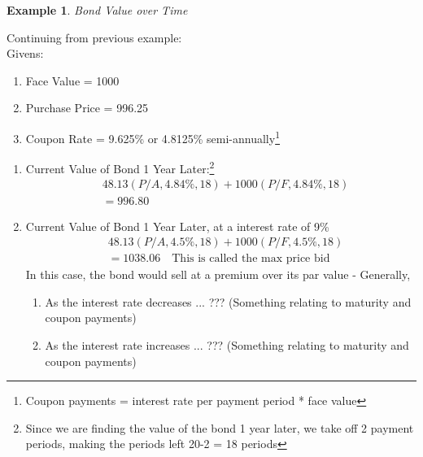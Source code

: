 \documentclass{report} %
\newtheorem{exmp}{Example}
\begin{document}
\begin{exmp}
    Bond Value over Time
\end{exmp}
Continuing from previous example: \\
Givens:
\begin{enumerate}
    \item Face Value = 1000
    \item Purchase Price = 996.25
    \item Coupon Rate = 9.625\% or 4.8125\% semi-annually\footnote{Coupon payments  = interest rate per payment period * face value}
\end{enumerate}
\begin{enumerate}
    \item Current Value of Bond 1 Year Later:\footnote{Since we are finding the value of the bond 1 year later, we take off 2 payment periods, making the periods left 20-2 = 18 periods}
    \begin{equation*}
        \begin{aligned}
            &48.13(P/A,4.84\%,18) + 1000(P/F,4.84\%,18) \\
            &= 996.80 
        \end{aligned}
    \end{equation*}
    \item Current Value of Bond 1 Year Later, at a interest rate of 9\%
    \begin{equation*}
        \begin{aligned}
            &48.13(P/A,4.5\%,18) + 1000(P/F,4.5\%,18) \\
            &=1038.06 \quad \text{This is called the max price bid}
        \end{aligned}
    \end{equation*}
    In this case, the bond would sell at a premium over its par value - Generally, 
    \begin{enumerate}
        \item As the interest rate decreases ... ??? (Something relating to maturity and coupon payments)
        \item As the interest rate increases ... ??? (Something relating to maturity and coupon payments)
    \end{enumerate}
\end{enumerate}
\end{document}
